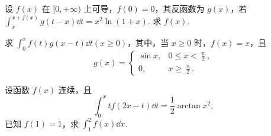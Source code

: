 	\begin{ti}
		设 $f(x)$ 在 $[0,+\infty)$ 上可导，$f(0) = 0$，其反函数为 $g(x)$，若 $\int_{x}^{x + f(x)} g(t - x) \dd{t} = x^{2} \ln(1 + x)$. 求 $f(x)$.
	\end{ti}

	\begin{ti}
		求 $\int_{0}^{x} f(t) g(x - t) \dd{t} (x \geq 0)$，其中，当 $x \geq 0$ 时，$f(x) = x$，且
		\[
			g(x) = \begin{cases}
				\sin x, & 0 \leq x < \frac{\uppi}{2},\\
				0, & x \geq \frac{\uppi}{2}.
			\end{cases}
		\]
	\end{ti}

	\begin{ti}
		设函数 $f(x)$ 连续，且
		\[
			\int_{0}^{x} t f(2x - t) \dd{t} = \frac{1}{2} \arctan x^{2},
		\]
		已知 $f(1) = 1$，求 $\int_{1}^{2} f(x) \dd{x}$.
	\end{ti}